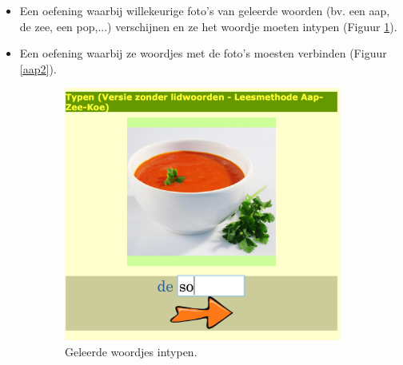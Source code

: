 \documentclass[a4paper,11pt]{article}
\theoremstyle{definition}
\begin{document}
\begin{itemize}
  \item Een oefening waarbij willekeurige foto's van geleerde woorden (bv. een aap, de zee, een pop,...) verschijnen 
  en ze het woordje moeten intypen (Figuur \ref{aap1}).
  \item Een oefening waarbij ze woordjes met de foto's moesten verbinden (Figuur \ref{aap2}). 
 \end{itemize}
 \begin{figure}[h!]
        \centering
        \begin{subfigure}{.5\textwidth}
          \centering
                \includegraphics[scale=0.15]{aap1.jpg}
                \caption{Geleerde woordjes intypen.}
                \label{aap1}
        \end{subfigure}%
        \begin{subfigure}{.5\textwidth}
           \centering

\end{subfigure}
\end{figure}
\end{document}
